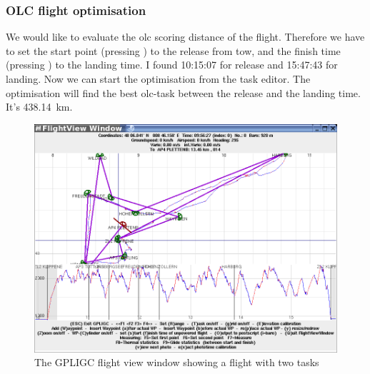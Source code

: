 \subsubsection{OLC flight optimisation}
We would like to evaluate the olc scoring distance of the flight. Therefore we have to set the start
point (pressing ) to the release from tow, and the finish time (pressing ) to the landing time.
I found 10:15:07 for release and 15:47:43 for landing. Now we can start the optimisation from the task editor.
The optimisation will find the best olc-task between the release and the landing time. It's 438.14~km.






\begin{figure}[h]
\caption{\label{flightview}The GPLIGC flight view window showing a flight with two tasks}
\begin{center}
\includegraphics[width=\textwidth]{png/flightview-1}
\end{center}
\end{figure}

